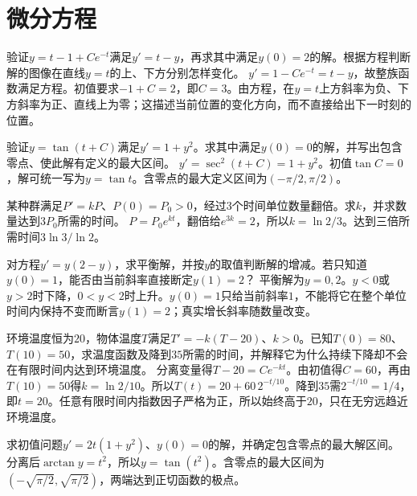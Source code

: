 \par\addvspace{12pt}

\section{微分方程}

验证\(y=t-1+Ce^{-t}\)满足\(y'=t-y\)，再求其中满足\(y(0)=2\)的解。根据方程判断解的图像在直线\(y=t\)的上、下方分别怎样变化。
\solutionanswer
\(y'=1-Ce^{-t}=t-y\)，故整族函数满足方程。初值要求\(-1+C=2\)，即\(C=3\)。由方程，在\(y=t\)上方斜率为负、下方斜率为正、直线上为零；这描述当前位置的变化方向，而不直接给出下一时刻的位置。


验证\(y=\tan(t+C)\)满足\(y'=1+y^2\)。求其中满足\(y(0)=0\)的解，并写出包含零点、使此解有定义的最大区间。
\solutionanswer
\(y'=\sec^2(t+C)=1+y^2\)。初值\(\tan C=0\)，解可统一写为\(y=\tan t\)。含零点的最大定义区间为\((-\pi/2,\pi/2)\)。


某种群满足\(P'=kP\)、\(P(0)=P_0>0\)，经过\(3\)个时间单位数量翻倍。求\(k\)，并求数量达到\(3P_0\)所需的时间。
\solutionanswer
\(P=P_0e^{kt}\)，翻倍给\(e^{3k}=2\)，所以\(k=\ln2/3\)。达到三倍所需时间\(3\ln3/\ln2\)。


对方程\(y'=y(2-y)\)，求平衡解，并按\(y\)的取值判断解的增减。若只知道\(y(0)=1\)，能否由当前斜率直接断定\(y(1)=2\)？
\solutionanswer
平衡解为\(y=0,2\)。\(y<0\)或\(y>2\)时下降，\(0<y<2\)时上升。\(y(0)=1\)只给当前斜率\(1\)，不能将它在整个单位时间内保持不变而断言\(y(1)=2\)；真实增长斜率随数量改变。


环境温度恒为\(20\)，物体温度\(T\)满足\(T'=-k(T-20)\)、\(k>0\)。已知\(T(0)=80\)、\(T(10)=50\)，求温度函数及降到\(35\)所需的时间，并解释它为什么持续下降却不会在有限时间内达到环境温度。
\solutionanswer
分离变量得\(T-20=Ce^{-kt}\)。由初值得\(C=60\)，再由\(T(10)=50\)得\(k=\ln2/10\)。所以\(T(t)=20+60\,2^{-t/10}\)。降到\(35\)需\(2^{-t/10}=1/4\)，即\(t=20\)。任意有限时间内指数因子严格为正，所以始终高于\(20\)，只在无穷远趋近环境温度。


求初值问题\(y'=2t(1+y^2)\)、\(y(0)=0\)的解，并确定包含零点的最大解区间。
\solutionanswer
分离后\(\arctan y=t^2\)，所以\(y=\tan(t^2)\)。含零点的最大区间为\((-\sqrt{\pi/2},\sqrt{\pi/2})\)，两端达到正切函数的极点。


